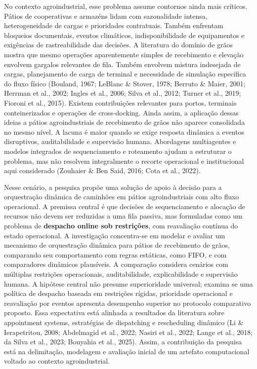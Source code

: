 \documentclass[
  12pt,
  oneside,
  a4paper,
  sumario=tradicional,
  brazil
]{abntex2}
\begin{document}
No contexto agroindustrial, esse problema assume contornos ainda mais cr\'iticos. P\'atios de cooperativas e armaz\'ens lidam com sazonalidade intensa, heterogeneidade de cargas e prioridades contratuais. Tamb\'em enfrentam bloqueios documentais, eventos clim\'aticos, indisponibilidade de equipamentos e exig\^encias de rastreabilidade das decis\~oes. A literatura do dom\'inio de gr\~aos mostra que mesmo opera\c{c}\~oes aparentemente simples de recebimento e eleva\c{c}\~ao envolvem gargalos relevantes de fila. Tamb\'em envolvem mistura indesejada de cargas, planejamento de carga de terminal e necessidade de simula\c{c}\~ao espec\'ifica do fluxo f\'isico (Bouland, 1967; LeBlanc \& Stover, 1978; Berruto \& Maier, 2001; Herrman et al., 2002; Ingles et al., 2006; Silva et al., 2012; Turner et al., 2019; Fioroni et al., 2015). Existem contribui\c{c}\~oes relevantes para portos, terminais conteinerizados e opera\c{c}\~oes de cross-docking. Ainda assim, a aplica\c{c}\~ao dessas ideias a p\'atios agroindustriais de recebimento de gr\~aos n\~ao aparece consolidada no mesmo n\'ivel. A lacuna \'e maior quando se exige resposta din\^amica a eventos disruptivos, auditabilidade e supervis\~ao humana. Abordagens multiagentes e modelos integrados de sequenciamento e roteamento ajudam a estruturar o problema, mas n\~ao resolvem integralmente o recorte operacional e institucional aqui considerado (Zouhaier \& Ben Said, 2016; Cota et al., 2022).

Nesse cen\'ario, a pesquisa prop\~oe uma solu\c{c}\~ao de apoio \`a decis\~ao para a orquestra\c{c}\~ao din\^amica de caminh\~oes em p\'atios agroindustriais com alto fluxo operacional. A premissa central \'e que decis\~oes de sequenciamento e aloca\c{c}\~ao de recursos n\~ao devem ser reduzidas a uma fila passiva, mas formuladas como um problema de \textbf{despacho online sob restri\c{c}\~oes}, com reavalia\c{c}\~ao cont\'inua do estado operacional. A investiga\c{c}\~ao concentra-se em modelar e avaliar um mecanismo de orquestra\c{c}\~ao din\^amica para p\'atios de recebimento de gr\~aos, comparando seu comportamento com regras est\'aticas, como FIFO, e com comparadores din\^amicos plaus\'iveis. A compara\c{c}\~ao considera cen\'arios com m\'ultiplas restri\c{c}\~oes operacionais, auditabilidade, explicabilidade e supervis\~ao humana. A hip\'otese central n\~ao presume superioridade universal; examina se uma pol\'itica de despacho baseada em restri\c{c}\~oes r\'igidas, prioridade operacional e reavalia\c{c}\~ao por eventos apresenta desempenho superior no protocolo comparativo proposto. Essa expectativa est\'a alinhada a resultados da literatura sobre appointment systems, estrat\'egias de dispatching e rescheduling din\^amico (Li \& Ierapetritou, 2008; Abdelmagid et al., 2022; Nasiri et al., 2022; Lange et al., 2018; da Silva et al., 2023; Bouyahia et al., 2025). Assim, a contribui\c{c}\~ao da pesquisa est\'a na delimita\c{c}\~ao, modelagem e avalia\c{c}\~ao inicial de um artefato computacional voltado ao contexto agroindustrial.
\end{document}
